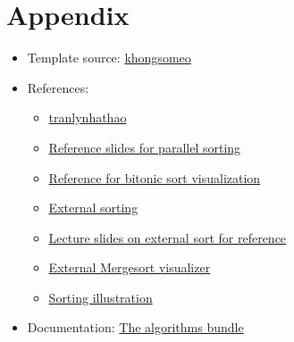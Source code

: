 \section{Appendix}
\begin{itemize}
    \item Template source: \href{https://github.com/khongsomeo/hcmus-unofficial-report-template}{khongsomeo} 
    \item References: 
    \begin{itemize}
    \item \href{https://github.com/tranlynhathao/fit-vnuhcmus_template}{tranlynhathao}
    \item \href{https://www.dcc.fc.up.pt/~ricroc/aulas/1516/cp/apontamentos/slides_sorting.pdf}{Reference slides for parallel sorting}
    \item \href{https://www.youtube.com/watch?v=GEQ8y26blEY}{Reference for bitonic sort visualization}
    \item \href{https://en.algorithmica.org/hpc/external-memory/sorting/}{External sorting}
    \item \href{https://thodrek.github.io/cs564-fall17/lectures/lecture-11/Lecture_11_ExtSort.pdf    }{Lecture slides on external sort for reference}
    \item \href{https://github.com/valeriodiste/ExternalMergeSortVisualizer}{External Mergesort visualizer}
    \item \href{https://users.cs.fiu.edu/~prabakar/cop4722/Common/SortingIllustration.pdf    }{Sorting illustration}
    \end{itemize}
    \item Documentation: \href{https://mirror.unpad.ac.id/ctan/macros/latex/contrib/algorithms/algorithms.pdf}{The algorithms bundle}
\end{itemize}